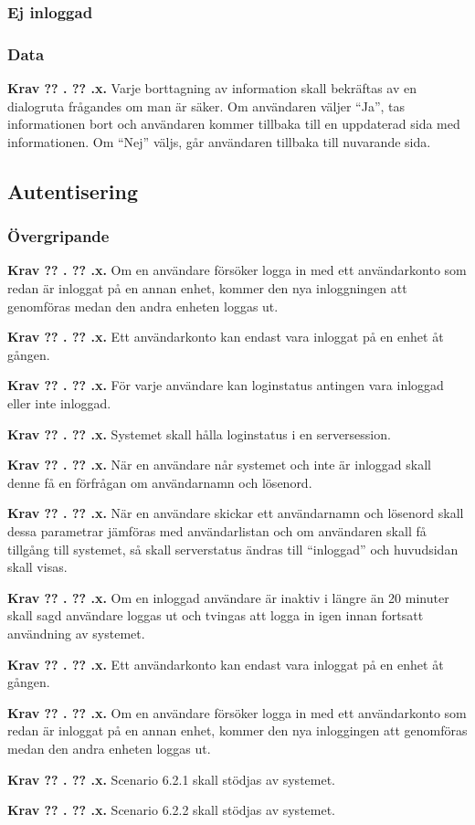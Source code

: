 \documentclass[a4paper]{article}
\newcommand\getcurrentref[1]{%
 \ifnumequal{\value{#1}}{0}
  {??}
  {\the\value{#1}}%
}
\newcommand\requirement[2]{
	\numberedrow{Krav}{#1}{#2}
}
\newcommand\numberedrow[3]{
	\noindent
	\textbf{#1 \getcurrentref{section}.\getcurrentref{subsection}.#2.} #3
	
}
\begin{document}
		\subsubsection*{Ej inloggad}
		\subsubsection*{Data}
		\requirement{x}{Varje borttagning av information skall bekräftas av en dialogruta frågandes om man är säker. Om användaren väljer ``Ja'', tas informationen bort och användaren kommer tillbaka till en uppdaterad sida med informationen. Om ``Nej'' väljs, går användaren tillbaka till nuvarande sida.}




	\subsection{Autentisering}
		\label{krav-funk-aut}
		\subsubsection*{Övergripande}
			\requirement{x}{Om en användare försöker logga in med ett användarkonto som redan är inloggat på en annan enhet, kommer den nya inloggningen att genomföras medan den andra enheten loggas ut. }
			\requirement{x}{Ett användarkonto kan endast vara inloggat på en enhet åt gången.}
			\requirement{x}{För varje användare kan loginstatus antingen vara inloggad eller inte inloggad.}
			\requirement{x}{Systemet skall hålla loginstatus i en serversession.}
			\requirement{x}{När en användare når systemet och inte är inloggad skall denne få en förfrågan om användarnamn och lösenord.}
			\requirement{x}{När en användare skickar ett användarnamn och lösenord skall dessa parametrar jämföras med användarlistan och om användaren skall få tillgång till systemet, så skall serverstatus ändras till “inloggad” och huvudsidan skall visas.}
			\requirement{x}{Om en inloggad användare är inaktiv i längre än 20 minuter skall sagd användare loggas ut och tvingas att logga in igen innan fortsatt användning av systemet.}
			\requirement{x}{Ett användarkonto kan endast vara inloggat på en enhet åt gången.}
			\requirement{x}{Om en användare försöker logga in med ett användarkonto som redan är inloggat på en annan enhet, kommer den nya inloggingen att genomföras medan den andra enheten loggas ut.}
			\requirement{x}{Scenario 6.2.1 skall stödjas av systemet.}
			\requirement{x}{Scenario 6.2.2 skall stödjas av systemet.}
\end{document}
